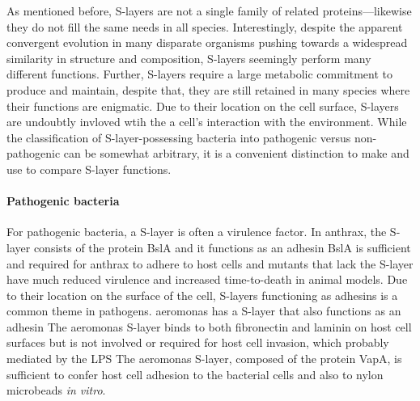   As mentioned before, \acp{S-layer} are not a single family of related proteins---likewise they do not fill the same needs in all species. Interestingly, despite the apparent convergent evolution in many disparate organisms pushing towards a widespread similarity in structure and composition, \acp{S-layer} seemingly perform many  different functions. Further, \acp{S-layer} require a large metabolic commitment to produce and maintain, despite that, they are still retained in many species where their functions are enigmatic. Due to their location on the cell surface, \acp{S-layer} are undoubtly invloved wtih the a cell's interaction with the environment. While the classification of \ac{S-layer}-possessing bacteria into pathogenic versus non-pathogenic can be somewhat arbitrary, it is a convenient distinction to make and use to compare \ac{S-layer} functions. 
  
  \paragraph{Pathogenic bacteria} For pathogenic bacteria, a \ac{S-layer} is often a virulence factor. In \ac{anthrax}, the \ac{S-layer} consists of the protein BslA and it functions as an adhesin BslA is sufficient and required for \ac{anthrax} to adhere to host cells and mutants that lack the \ac{S-layer} have much reduced virulence and increased time-to-death in animal models. Due to their location on the surface of the cell, \acp{S-layer} functioning as adhesins is a common theme in pathogens. \ac{aeromonas} has a \ac{S-layer} that also functions as an adhesin The \ac{aeromonas} \ac{S-layer} binds to both fibronectin and laminin on host cell surfaces but is not involved or required for host cell invasion, which probably mediated by the \ac{LPS}
  The \ac{aeromonas} \ac{S-layer}, composed of the protein VapA, is sufficient to confer host cell adhesion to the bacterial cells and also to nylon microbeads \textit{in vitro}. 

